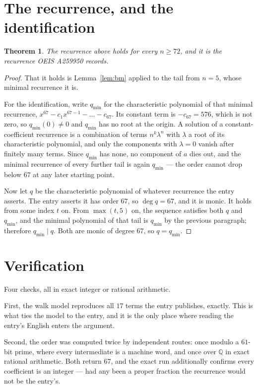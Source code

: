 \documentclass[11pt,a4paper]{article}
\theoremstyle{plain}
\newtheorem{theorem}{Theorem}
\theoremstyle{definition}
\begin{document}
\section{The recurrence, and the identification}

\begin{theorem}
The recurrence above holds for every $n\ge72$, and it is the recurrence OEIS A259950 records.
\end{theorem}

\begin{proof}
That it holds is Lemma~\ref{lem:bm} applied to the tail from $n=5$, whose minimal
recurrence it is.

For the identification, write $q_{\min}$ for the characteristic polynomial of that minimal
recurrence, $x^{67}-c_1x^{67-1}-\dots-c_{67}$. Its constant term is
$-c_{67}=576$, which is not zero, so $q_{\min}(0)\neq0$ and $q_{\min}$ has no
root at the origin. A solution of a constant-coefficient recurrence is a combination of terms
$n^{k}\lambda^{n}$ with $\lambda$ a root of its characteristic polynomial, and only the
components with $\lambda=0$ vanish after finitely many terms. Since $q_{\min}$ has none, no
component of $a$ dies out, and the minimal recurrence of every further tail is again
$q_{\min}$ --- the order cannot drop below $67$ at any later starting point.

Now let $q$ be the characteristic polynomial of whatever recurrence the entry asserts. The
entry asserts it has order $67$, so $\deg q=67$, and it is monic. It holds from some
index $t$ on. From $\max(t,5)$ on, the sequence satisfies both $q$ and $q_{\min}$, and
the minimal polynomial of that tail is $q_{\min}$ by the previous paragraph; therefore
$q_{\min}\mid q$. Both are monic of degree $67$, so $q=q_{\min}$.
\end{proof}

\section{Verification}

Four checks, all in exact integer or rational arithmetic.

First, the walk model reproduces all $17$ terms the entry publishes, exactly. This is
what ties the model to the entry, and it is the only place where reading the entry's English
enters the argument.

Second, the order was computed twice by independent routes: once modulo a $61$-bit prime, where
every intermediate is a machine word, and once over $\mathbb{Q}$ in exact rational arithmetic.
Both return $67$, and the exact run additionally confirms every coefficient is an integer
--- had any been a proper fraction the recurrence would not be the entry's.
\end{document}
